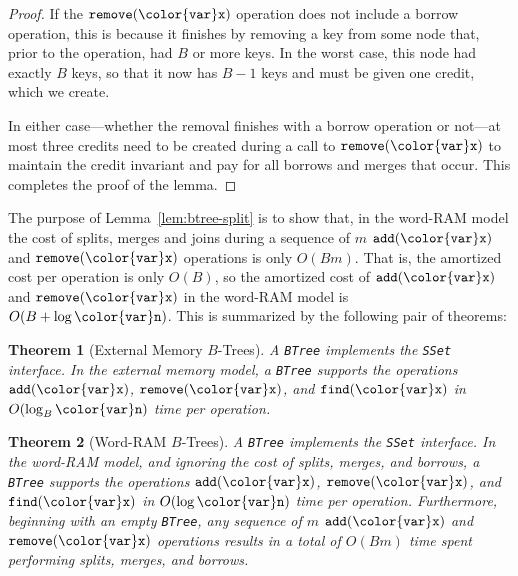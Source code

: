\documentclass[10pt]{book}
\theoremstyle{plain}
\newtheorem{thm}{Theorem}[chapter]
\newcommand{\lemref}[1]{Lemma~\ref{lem:#1}}
\theoremstyle{definition}
\begin{document}
\begin{proof}
  If the \ensuremath{\mathtt{remove({\color{var}x})}} operation does not include a borrow operation, this
  is because it finishes by removing a key from some node that, prior
  to the operation, had $B$ or more keys.  In the worst case, this node
  had exactly $B$ keys, so that it now has $B-1$ keys and must be given
  one credit, which we create.

  In either case---whether the removal finishes with a borrow
  operation or not---at most three credits need to be created during a
  call to \ensuremath{\mathtt{remove({\color{var}x})}} to maintain the credit invariant and pay for all
  borrows and merges that occur. This completes the proof of the lemma.
\end{proof}

The purpose of \lemref{btree-split} is to show that, in the word-RAM
model the cost of splits, merges and joins during a sequence of $m$
\ensuremath{\mathtt{add({\color{var}x})}} and \ensuremath{\mathtt{remove({\color{var}x})}} operations is only $O(Bm)$.  That is, the
amortized cost per operation is only $O(B)$, so the amortized cost
of \ensuremath{\mathtt{add({\color{var}x})}} and \ensuremath{\mathtt{remove({\color{var}x})}} in the word-RAM model is $O(B+\log \ensuremath{\mathtt{{\color{var}n}}})$.
This is summarized by the following pair of theorems:

\begin{thm}[External Memory $B$-Trees]
  A \texttt{BTree} implements the \texttt{SSet} interface. In the external memory model,
  a \texttt{BTree} supports the operations \ensuremath{\mathtt{add({\color{var}x})}}, \ensuremath{\mathtt{remove({\color{var}x})}}, and \ensuremath{\mathtt{find({\color{var}x})}}
  in $O(\log_B \ensuremath{\mathtt{{\color{var}n}}})$ time per operation.
\end{thm}

\begin{thm}[Word-RAM $B$-Trees]
  A \texttt{BTree} implements the \texttt{SSet} interface. In the word-RAM model, and
  ignoring the cost of splits, merges, and borrows, a \texttt{BTree} supports
  the operations \ensuremath{\mathtt{add({\color{var}x})}}, \ensuremath{\mathtt{remove({\color{var}x})}}, and \ensuremath{\mathtt{find({\color{var}x})}} in $O(\log \ensuremath{\mathtt{{\color{var}n}}})$
  time per operation.
  Furthermore, beginning with an empty \texttt{BTree}, any sequence of $m$
  \ensuremath{\mathtt{add({\color{var}x})}} and \ensuremath{\mathtt{remove({\color{var}x})}} operations results in a total of $O(Bm)$
  time spent performing splits, merges, and borrows.
\end{thm}
\end{document}
